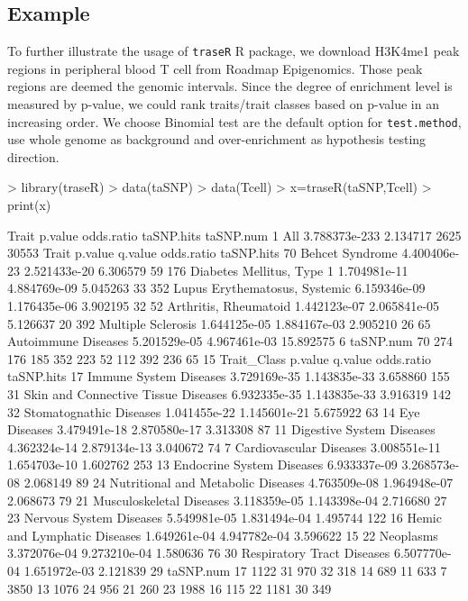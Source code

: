 \documentclass{article}
\begin{document}
\subsection{Example}
To further illustrate the usage of {\tt traseR}  R package, we download H3K4me1 peak regions in peripheral blood T cell from Roadmap Epigenomics. Those peak regions are deemed the genomic intervals. Since the degree of enrichment level is measured by p-value, we could rank traits/trait classes based on p-value in an increasing order. We choose Binomial test are the default option for {\tt test.method}, use whole genome as background and over-enrichment as hypothesis testing direction.
\begin{Schunk}
\begin{Sinput}
> library(traseR)
> data(taSNP)
> data(Tcell)
> x=traseR(taSNP,Tcell)
> print(x)
\end{Sinput}
\begin{Soutput}
  Trait       p.value odds.ratio taSNP.hits taSNP.num
1   All 3.788373e-233   2.134717       2625     30553
                            Trait      p.value      q.value odds.ratio taSNP.hits
70                Behcet Syndrome 4.400406e-23 2.521433e-20   6.306579         59
176     Diabetes Mellitus, Type 1 1.704981e-11 4.884769e-09   5.045263         33
352 Lupus Erythematosus, Systemic 6.159346e-09 1.176435e-06   3.902195         32
52          Arthritis, Rheumatoid 1.442123e-07 2.065841e-05   5.126637         20
392            Multiple Sclerosis 1.644125e-05 1.884167e-03   2.905210         26
65            Autoimmune Diseases 5.201529e-05 4.967461e-03  15.892575          6
    taSNP.num
70        274
176       185
352       223
52        112
392       236
65         15
                           Trait_Class      p.value      q.value odds.ratio taSNP.hits
17              Immune System Diseases 3.729169e-35 1.143835e-33   3.658860        155
31 Skin and Connective Tissue Diseases 6.932335e-35 1.143835e-33   3.916319        142
32             Stomatognathic Diseases 1.041455e-22 1.145601e-21   5.675922         63
14                        Eye Diseases 3.479491e-18 2.870580e-17   3.313308         87
11           Digestive System Diseases 4.362324e-14 2.879134e-13   3.040672         74
7              Cardiovascular Diseases 3.008551e-11 1.654703e-10   1.602762        253
13           Endocrine System Diseases 6.933337e-09 3.268573e-08   2.068149         89
24  Nutritional and Metabolic Diseases 4.763509e-08 1.964948e-07   2.068673         79
21            Musculoskeletal Diseases 3.118359e-05 1.143398e-04   2.716680         27
23             Nervous System Diseases 5.549981e-05 1.831494e-04   1.495744        122
16        Hemic and Lymphatic Diseases 1.649261e-04 4.947782e-04   3.596622         15
22                           Neoplasms 3.372076e-04 9.273210e-04   1.580636         76
30          Respiratory Tract Diseases 6.507770e-04 1.651972e-03   2.121839         29
   taSNP.num
17      1122
31       970
32       318
14       689
11       633
7       3850
13      1076
24       956
21       260
23      1988
16       115
22      1181
30       349
\end{Soutput}
\end{Schunk}
\end{document}
